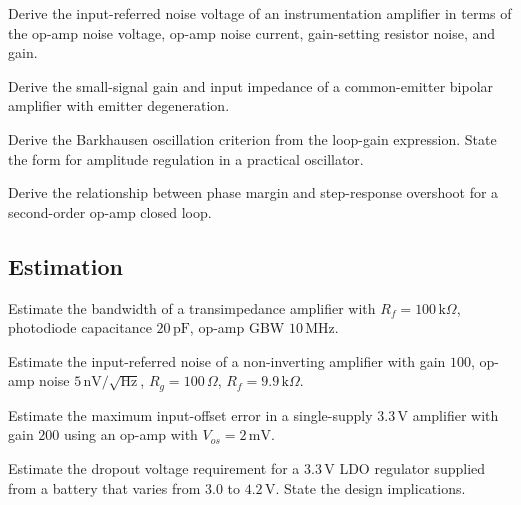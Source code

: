 \begin{exercise}
Derive the input-referred noise voltage of an instrumentation amplifier in terms of the op-amp noise voltage, op-amp noise current, gain-setting resistor noise, and gain.
\end{exercise}

\begin{exercise}
Derive the small-signal gain and input impedance of a common-emitter bipolar amplifier with emitter degeneration.
\end{exercise}

\begin{exercise}
Derive the Barkhausen oscillation criterion from the loop-gain expression. State the form for amplitude regulation in a practical oscillator.
\end{exercise}

\begin{exercise}
Derive the relationship between phase margin and step-response overshoot for a second-order op-amp closed loop.
\end{exercise}

\subsection*{Estimation}

\begin{exercise}
Estimate the bandwidth of a transimpedance amplifier with $R_f = 100\,\text{k}\Omega$, photodiode capacitance $20\,\text{pF}$, op-amp GBW $10\,\text{MHz}$.
\end{exercise}

\begin{exercise}
Estimate the input-referred noise of a non-inverting amplifier with gain $100$, op-amp noise $5\,\text{nV}/\sqrt{\text{Hz}}$, $R_g = 100\,\Omega$, $R_f = 9.9\,\text{k}\Omega$.
\end{exercise}

\begin{exercise}
Estimate the maximum input-offset error in a single-supply $3.3\,\text{V}$ amplifier with gain $200$ using an op-amp with $V_{os} = 2\,\text{mV}$.
\end{exercise}

\begin{exercise}
Estimate the dropout voltage requirement for a $3.3\,\text{V}$ LDO regulator supplied from a battery that varies from $3.0$ to $4.2\,\text{V}$. State the design implications.
\end{exercise}

